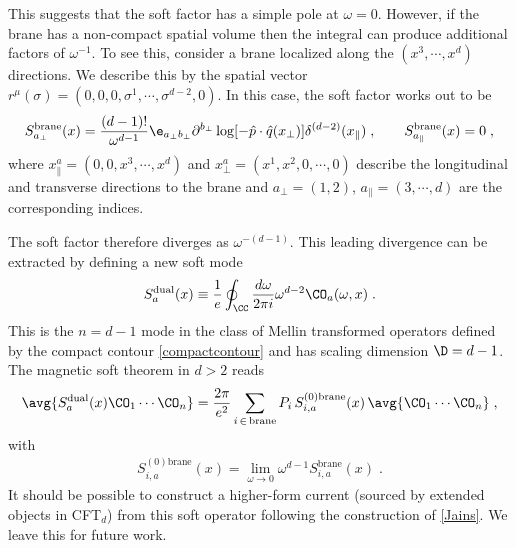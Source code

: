 \documentclass[11pt]{article}
\def\d{{\delta}}
\def\o{{\omega}}
\def\p{{\partial}}
\def\s{{\sigma}}
\def\dual{{\text{dual}}}
\begin{document}
This suggests that the soft factor has a simple pole at $\o  = 0$. However, if the brane has a non-compact spatial volume then the integral can produce additional factors of $\o^{-1}$. To see this, consider a brane localized along the $(x^3,\cdots,x^d)$ directions. We describe this by the spatial vector $r^\mu(\s) = (0,0,0,\s^1,\cdots,\s^{d-2},0)$. In this case, the soft factor works out to be
\begin{equation}
\begin{split}\label{branesfspecial}
S^{\text{brane}}_{a_\perp} (x) =  \frac{(d-1)!}{\o^{d-1} } \e_{a_\perp b_\perp} \p^{b_\perp} \log [ - {\hat p} \cdot {\hat q}(x_\perp) ]   \d^{(d-2)} ( x_\| ) \;  , \qquad S^{\text{brane}}_{a_\|} (x) = 0 \; , 
\end{split}
\end{equation}
where $x^a_\| = (0,0,x^3 ,\cdots,x^d)$ and $x^a_\perp = ( x^1 , x^2 , 0 , \cdots , 0)$ describe the longitudinal and transverse directions to the brane and $a_\perp=(1,2)$, $a_\| = (3,\cdots,d)$ are the corresponding indices. 

The soft factor therefore diverges as $\o^{-(d-1)}$. This leading divergence can be extracted by defining a new soft mode
\begin{equation}
\begin{split}
S^\dual_a(x) \equiv \frac{1}{e} \oint_\CC \frac{d\o}{2\pi i} \o^{d-2} \CO_a(\o,x) \;  . 
\end{split}
\end{equation}
This is the $n=d-1$ mode in the class of Mellin transformed operators defined by the compact contour \eqref{compactcontour} and has scaling dimension $\D = d-1$. The magnetic soft theorem in $d>2$ reads
\begin{equation}
\begin{split}\label{magsoftthmhigherd}
\avg{ S^\dual_a(x) \CO_1 \cdots \CO_n } = \frac{2\pi}{e^2} \sum_{i\,\in\,\text{brane}} P_i \, S^{(0)\text{brane}}_{i,a}(x)  \, \avg{ \CO_1 \cdots \CO_n } \; , 
\end{split}
\end{equation}
with
\begin{equation}
\begin{split}
S^{(0)\text{brane}}_{i,a}(x)  = \lim_{\o \to 0} \o^{d-1} S^{\text{brane}}_{i,a}(x) \; . 
\end{split}
\end{equation}
It should be possible to construct a higher-form current (sourced by extended objects in CFT$_d$) from this soft operator following the construction of \eqref{Jains}. We leave this for future work.  
\end{document}

